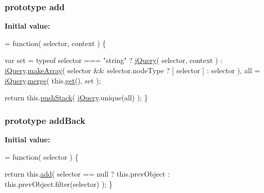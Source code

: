 \hypertarget{jquery-1_810_82-vsdoc_8js_a2f34e089948aad779d5a43c9b381caa6}{
\subsubsection[{add}]{ {\bf prototype} add}}\label{jquery-1_810_82-vsdoc_8js_a2f34e089948aad779d5a43c9b381caa6}
{\bfseries Initial value\-:}
\begin{DoxyCode}
= \textcolor{keyword}{function}( selector, context ) \{


        var set = typeof selector === \textcolor{stringliteral}{"string"} ?
                \hyperlink{jquery-1_810_82-vsdoc_8js_add5237586d970a38a81f990e8eb28c6c}{jQuery}( selector, context ) :
                \hyperlink{jquery-1_810_82-vsdoc_8js_add5237586d970a38a81f990e8eb28c6c}{jQuery}.\hyperlink{jquery-1_810_82-vsdoc_8js_aeb415829cbd66d6538dadc5de9adc5ab}{makeArray}( selector && selector.nodeType ? [ selector ] : selector ),
            all = \hyperlink{jquery-1_810_82-vsdoc_8js_add5237586d970a38a81f990e8eb28c6c}{jQuery}.\hyperlink{jquery-1_810_82-vsdoc_8js_a32b25eeaa50c1bd6453e8956949b36e3}{merge}( this.\hyperlink{jquery-1_810_82-vsdoc_8js_a904e08d31e9d836b29247ea5e274ae83}{get}(), set );

        \textcolor{keywordflow}{return} this.\hyperlink{jquery-1_810_82-vsdoc_8js_afc3a7db1ef2b526338c06c07cecccd44}{pushStack}( \hyperlink{jquery-1_810_82-vsdoc_8js_add5237586d970a38a81f990e8eb28c6c}{jQuery}.unique(all) );
    \}
\end{DoxyCode}
\hypertarget{jquery-1_810_82-vsdoc_8js_a02deded61c52384361b4c1f47f86bb03}{
\subsubsection[{add\-Back}]{ {\bf prototype} add\-Back}}\label{jquery-1_810_82-vsdoc_8js_a02deded61c52384361b4c1f47f86bb03}
{\bfseries Initial value\-:}
\begin{DoxyCode}
= \textcolor{keyword}{function}( selector ) \{

        \textcolor{keywordflow}{return} this.\hyperlink{jquery-1_810_82-vsdoc_8js_a2f34e089948aad779d5a43c9b381caa6}{add}( selector == null ?
            this.prevObject : this.prevObject.filter(selector)
        );
    \}
\end{DoxyCode}
